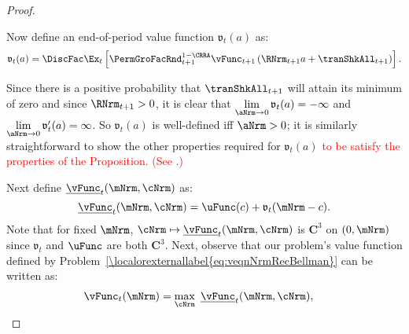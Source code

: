\documentclass[\econtexRoot/BufferStockTheory]{subfiles}
\begin{document}
\begin{proof}

\hypertarget{BoroCnstNat}{}
Now define an end-of-period value function $\mathfrak{v}_{t}(a) $ as:
\begin{equation}\label{eq:vfFrackdefn}
  \mathfrak{v}_{t}(a) =\DiscFac \Ex_{t}\left[{\PermGroFacRnd}_{t+1}^{1-\CRRA}\vFunc_{t+1}\left({\RNrm}_{t+1} a+{\tranShkAll}_{t+1}\right) \right].%
\end{equation}

Since there is a positive probability that $\tranShkAll_{t+1}$ will
attain its minimum of zero and since ${\RNrm}_{t+1}>0$, it
is clear that $\lim\limits_{\aNrm \rightarrow 0} \mathfrak{v}_{t}(a) = -\infty$
and $\lim\limits_{\aNrm \rightarrow 0} \mathfrak{v}^{\prime}_{t}(a) = \infty$.  So
$\mathfrak{v}_{t}(a) $ is well-defined iff $\aNrm>0$; it is similarly
straightforward to show the other properties required for $\mathfrak{v}_{t}(a) $ \textcolor{red}{to
be satisfy the properties of the Proposition.  (See \cite{hiraguchiBSProofs}.)}

Next define $\underline{\vFunc}_{t}(\mNrm,\cNrm)$ as:
%
%
\begin{equation}
  \underline{\vFunc}_{t}(\mNrm,\cNrm)=\uFunc(c)+\mathfrak{v}_{t}(\mNrm-c). 
\end{equation}
%
Note that for fixed $\mNrm$, $\cNrm \mapsto \underline{\vFunc}_{t}(\mNrm,\cNrm)$ is $\mathbf{C}^{3}$ on $(0, \mNrm)$ since $\mathfrak{v}_{t}$ and $\uFunc$ are both
$\mathbf{C}^{3}$. Next,  observe that our problem's value function defined
by Problem~\eqref{\localorexternallabel{eq:veqnNrmRecBellman}} can be written as:
%
%
%
\begin{equation}\begin{gathered}\begin{aligned}
      \vFunc_{t}(\mNrm)  & =  \max_{\cNrm}~\underline{\vFunc}_{t}(\mNrm,\cNrm), 
    \end{aligned}\end{gathered}\end{equation}


\end{proof}
\end{document}

